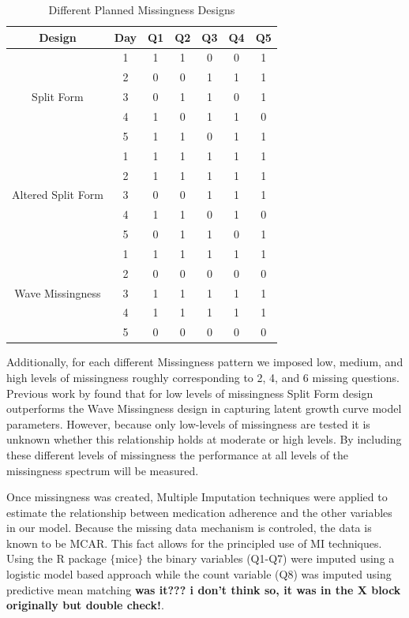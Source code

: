 \documentclass{svjour3}\usepackage[]{graphicx}\usepackage[]{color}
\begin{document}
\begin{table}[H]
	\centering
	\caption{Different Planned Missingness Designs}
	\setlength{\tabcolsep}{0.45cm}
	\label{tab:table14}
	\hspace*{-1cm}
	\begin{tabular}{c|c|ccccc}
		\toprule
		Design & Day & Q1 & Q2 & Q3 & Q4 & Q5 \\
		\midrule
		\multirow{5}{*}{Split Form}
		& 1 & 1 & 1 & 0 & 0 & 1 \\
		& 2 & 0 & 0 & 1 & 1 & 1 \\
		& 3 & 0 & 1 & 1 & 0 & 1 \\
		& 4 & 1 & 0 & 1 & 1 & 0 \\
		& 5 & 1 & 1 & 0 & 1 & 1 \\
		\midrule
		\midrule
		\multirow{5}{*}{Altered Split Form}
		& 1 & 1 & 1 & 1 & 1 & 1 \\
		& 2 & 1 & 1 & 1 & 1 & 1 \\
		& 3 & 0 & 0 & 1 & 1 & 1 \\
		& 4 & 1 & 1 & 0 & 1 & 0 \\
		& 5 & 0 & 1 & 1 & 0 & 1 \\
		\midrule
		\midrule
		\multirow{5}{*}{Wave Missingness}
		& 1 & 1 & 1 & 1 & 1 & 1 \\
		& 2 & 0 & 0 & 0 & 0 & 0 \\
		& 3 & 1 & 1 & 1 & 1 & 1 \\
		& 4 & 1 & 1 & 1 & 1 & 1 \\
		& 5 & 0 & 0 & 0 & 0 & 0 \\
		\bottomrule
	\end{tabular}
	\hspace*{-1cm}	
\end{table}

Additionally, for each different Missingness pattern we imposed low, medium, and high levels of missingness roughly corresponding to 2, 4, and 6 missing questions. Previous work by \citet{rhemtulla2014planned} found that for low levels of missingness Split Form design outperforms the Wave Missingness design in capturing latent growth curve model parameters. However, because only low-levels of missingness are tested it is unknown whether this relationship holds at moderate or high levels. By including these different levels of missingness the performance at all levels of the missingness spectrum will be measured. \par
Once missingness was created, Multiple Imputation techniques were applied to estimate the relationship between medication adherence and the other variables in our model. Because the missing data mechanism is controled, the data is known to be MCAR. This fact allows for the principled use of MI techniques. Using the R package $\{$mice$\}$ \citep{mice2011imputation} the binary variables (Q1-Q7) were imputed using a logistic model based approach while the count variable (Q8) was imputed using predictive mean matching \textbf{was it??? i don't think so, it was in the X block originally but double check!}. \par
\end{document}

